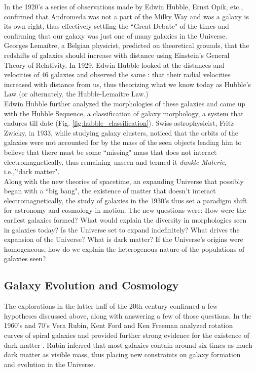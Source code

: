 In the 1920's a series of observations made by Edwin Hubble, Ernst Opik, etc., confirmed that Andromeda was not a part of the Milky Way and was a galaxy is its own right, thus effectively settling the ``Great Debate" of the times and confirming that our galaxy was just one of many galaxies in the Universe. Georges Lema{\'i}tre, a Belgian physicist, predicted on theoretical grounds, that the redshifts of galaxies should increase with distance using Einstein's General Theory of Relativity. In 1929, Edwin Hubble looked at the distances and velocities of 46 galaxies and observed the same \citep{1929PNAS...15..168H}: that their radial velocities increased with distance from us, thus theorizing what we know today as Hubble's Law (or alternately, the Hubble-Lema{\'i}tre Law.)\\

Edwin Hubble further analyzed the morphologies of these galaxies and came up with the Hubble Sequence, a classification of galaxy morphology, a system that endures till date (Fig. \ref{fig:hubble_classification}). Swiss astrophysicist, Fritz Zwicky, in 1933, while studying galaxy clusters, noticed that the orbits of the galaxies were not accounted for by the mass of the seen objects leading him to believe that there must be some ``missing" mass \citep{1937ApJ....86..217Z} that does not interact electromagnetically, thus remaining unseen and termed it \emph{dunkle Materie}, i.e.,'`dark matter".\\

Along with the new theories of spacetime, an expanding Universe that possibly began with a ``big bang", the existence of matter that doesn't interact electromagnetically, the study of galaxies in the 1930's thus set a paradigm shift for astronomy and cosmology in motion. The new questions were: How were the earliest galaxies formed? What would explain the diversity in morphologies seen in galaxies today? Is the Universe set to expand indefinitely? What drives the expansion of the Universe? What is dark matter? If the Universe's origins were homogeneous, how do we explain the heterogenous nature of the populations of galaxies seen?\\

\subsection{Galaxy Evolution and Cosmology}

The explorations in the latter half of the 20th century confirmed a few hypotheses discussed above, along with answering a few of those questions. In the 1960's and 70's Vera Rubin, Kent Ford and Ken Freeman analyzed rotation curves of spiral galaxies and provided further strong evidence for the existence of dark matter \citep{freeman_disks_1970-1}. Rubin inferred that most galaxies contain around six times as much dark matter as visible mass\citep{rubin_rotational_1980}, thus placing new constraints on galaxy formation and evolution in the Universe.\\

